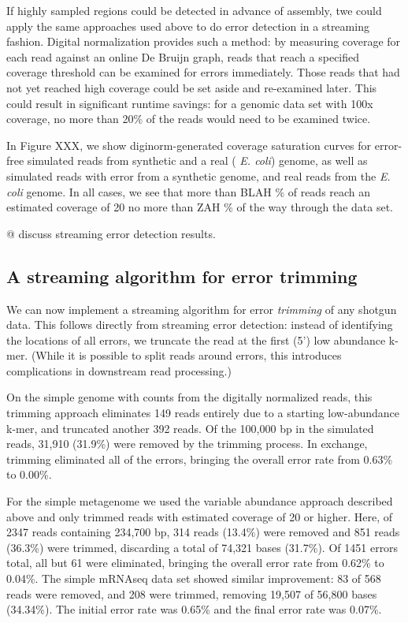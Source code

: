 If highly sampled regions could be detected in advance of assembly,
twe could apply the same approaches used above to do error detection
in a streaming fashion.  Digital normalization provides such a method:
by measuring coverage for each read against an online De Bruijn graph,
reads that reach a specified coverage threshold can be examined for
errors immediately.  Those reads that had not yet reached high
coverage could be set aside and re-examined later.  This could result
in significant runtime savings: for a genomic data set with 100x
coverage, no more than 20\% of the reads would need to be examined
twice.

In Figure XXX, we show diginorm-generated coverage saturation curves
for error-free simulated reads from synthetic and a real ({\em
  E. coli}) genome, as well as simulated reads with error from a
synthetic genome, and real reads from the {\em E. coli} genome.  In
all cases, we see that more than BLAH \% of reads reach an estimated
coverage of 20 no more than ZAH \% of the way through the data set.

@ discuss streaming error detection results.

\subsection{A streaming algorithm for error trimming}

We can now implement a streaming algorithm for error {\em trimming} of
any shotgun data.  This follows directly from streaming error
detection: instead of identifying the locations of all errors, we
truncate the read at the first (5') low abundance k-mer.  (While it is
possible to split reads around errors, this introduces complications
in downstream read processing.)

On the simple genome with counts from the digitally normalized reads,
this trimming approach eliminates 149 reads entirely due to a starting
low-abundance k-mer, and truncated another 392 reads.  Of the 100,000
bp in the simulated reads, 31,910 (31.9\%) were removed by the
trimming process.  In exchange, trimming eliminated all of the errors,
bringing the overall error rate from 0.63\% to 0.00\%.

For the simple metagenome we used the variable abundance approach
described above and only trimmed reads with estimated coverage of 20
or higher.  Here, of 2347 reads containing 234,700 bp, 314 reads
(13.4\%) were removed and 851 reads (36.3\%) were trimmed, discarding
a total of 74,321 bases (31.7\%).  Of 1451 errors total, all but 61
were eliminated, bringing the overall error rate from 0.62\% to
0.04\%.  The simple mRNAseq data set showed similar improvement: 83 of
568 reads were removed, and 208 were trimmed, removing 19,507 of
56,800 bases (34.34\%).  The initial error rate was 0.65\% and the
final error rate was 0.07\%.

